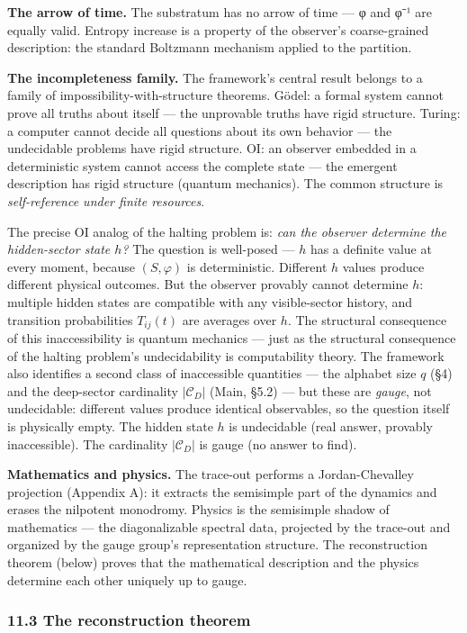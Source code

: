 \documentclass[
  11pt,
]{article}
\begin{document}
\textbf{The arrow of time.} The substratum has no arrow of time --- φ
and φ⁻¹ are equally valid. Entropy increase is a property of the
observer's coarse-grained description: the standard Boltzmann mechanism
applied to the partition.

\textbf{The incompleteness family.} The framework's central result
belongs to a family of impossibility-with-structure theorems. Gödel: a
formal system cannot prove all truths about itself --- the unprovable
truths have rigid structure. Turing: a computer cannot decide all
questions about its own behavior --- the undecidable problems have rigid
structure. OI: an observer embedded in a deterministic system cannot
access the complete state --- the emergent description has rigid
structure (quantum mechanics). The common structure is
\emph{self-reference under finite resources}.

The precise OI analog of the halting problem is: \emph{can the observer
determine the hidden-sector state \(h\)?} The question is well-posed ---
\(h\) has a definite value at every moment, because \((S, \varphi)\) is
deterministic. Different \(h\) values produce different physical
outcomes. But the observer provably cannot determine \(h\): multiple
hidden states are compatible with any visible-sector history, and
transition probabilities \(T_{ij}(t)\) are averages over \(h\). The
structural consequence of this inaccessibility is quantum mechanics ---
just as the structural consequence of the halting problem's
undecidability is computability theory. The framework also identifies a
second class of inaccessible quantities --- the alphabet size \(q\) (§4)
and the deep-sector cardinality \(|\mathcal{C}_D|\) (Main, §5.2) --- but
these are \emph{gauge}, not undecidable: different values produce
identical observables, so the question itself is physically empty. The
hidden state \(h\) is undecidable (real answer, provably inaccessible).
The cardinality \(|\mathcal{C}_D|\) is gauge (no answer to find).

\textbf{Mathematics and physics.} The trace-out performs a
Jordan-Chevalley projection (Appendix A): it extracts the semisimple
part of the dynamics and erases the nilpotent monodromy. Physics is the
semisimple shadow of mathematics --- the diagonalizable spectral data,
projected by the trace-out and organized by the gauge group's
representation structure. The reconstruction theorem (below) proves that
the mathematical description and the physics determine each other
uniquely up to gauge.

\hypertarget{the-reconstruction-theorem}{%
\subsubsection{11.3 The reconstruction
theorem}\label{the-reconstruction-theorem}}
\end{document}
